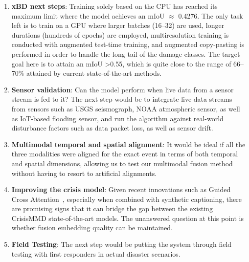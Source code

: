 \documentclass[journal]{IEEEtran}
\begin{document}
\begin{enumerate}
    \item \textbf{xBD next steps}: Training solely based on the CPU has reached its maximum limit where the model achieves an mIoU $\approx$ 0.4276. The only task left is to train on a GPU where larger batches (16--32) are used, longer durations (hundreds of epochs) are employed, multiresolution training is conducted with augmented test-time training, and augmented copy-pasting is performed in order to handle the long-tail of the damage classes. The target goal here is to attain an mIoU \textgreater 0.55, which is quite close to the range of 66--70\% attained by current state-of-the-art methods.
    \item \textbf{Sensor validation}: Can the model perform when live data from a sensor stream is fed to it? The next step would be to integrate live data streams from sensors such as USGS seismograph, NOAA atmospheric sensor, as well as IoT-based flooding sensor, and run the algorithm against real-world disturbance factors such as data packet loss, as well as sensor drift.
    \item \textbf{Multimodal temporal and spatial alignment}: It would be ideal if all the three modalities were aligned for the exact event in terms of both temporal and spatial dimensions, allowing us to test our multimodal fusion method without having to resort to artificial alignments.
    \item \textbf{Improving the crisis model}: Given recent innovations such as Guided Cross Attention~\cite{mouzannar2025guidedcross}, especially when combined with synthetic captioning, there are promising signs that it can bridge the gap between the existing CrisisMMD state-of-the-art models. The unanswered question at this point is whether fusion embedding quality can be maintained.
    \item \textbf{Field Testing}: The next step would be putting the system through field testing with first responders in actual disaster scenarios.
\end{enumerate}
\end{document}
